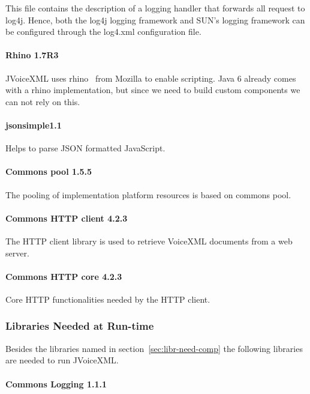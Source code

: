 \documentclass[11pt,a4paper]{article}
\begin{document}
This file contains the description of a logging handler that forwards all
request to log4j. Hence, both the log4j logging framework and SUN's logging
framework can be configured through the log4.xml configuration file.

\paragraph{Rhino 1.7R3}

JVoiceXML uses rhino~\cite{rhino} from Mozilla to enable scripting.
Java 6 already comes with a rhino implementation, but since we need to
build custom components we can not rely on this.

\paragraph{jsonsimple1.1}

Helps to parse JSON formatted JavaScript.

\paragraph{Commons pool 1.5.5}

The pooling of implementation platform resources is based on commons
pool.

\paragraph{Commons HTTP client 4.2.3}

The HTTP client library is used to retrieve VoiceXML documents from a web
server.

\paragraph{Commons HTTP core 4.2.3}

Core HTTP functionalities needed by the HTTP client.

\subsubsection{Libraries Needed at Run-time}

Besides the libraries named in section~\ref{sec:libr-need-comp} the following
libraries are needed to run JVoiceXML.

\paragraph{Commons Logging 1.1.1}
\label{sec:commons-logging}
\end{document}
